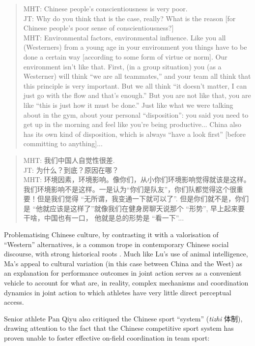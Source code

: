 \begin{CJK}{UTF8}{gbsn}
\begin{quote}
  MHT: Chinese people's conscientiousness is very poor.\\
  JT: Why do you think that is the case, really? What is the reason [for Chinese people's poor sense of conscientiousness?] \\ MHT: Environmental factors, environmental influence.  Like you all (Westerners) from a young age in your environment you things have to be done a certain way [according to some form of virtue or norm].  Our environment isn’t like that.  First, (in a group situation) you (as a Westerner) will think ``we are all teammates,'' and your team all think that this principle is very important.  But we all think ``it doesn’t matter, I can just go with the flow and that’s enough.''  But you are not like that, you are like ``this is just how it must be done.'' Just like what we were talking about in the gym, about your personal ``disposition'': you said you need to get up in the morning and feel like you're being productive... China also has its own kind of disposition, which is always ``have a look first'' [before committing to anything]...
\end{quote}

\begin{quote}
  MHT: 我们中国人自觉性很差. \\
  JT: 为什么？到底？原因在哪？\\
  MHT: 环境因素，环境影响。像你们，从小你们环境影响觉得就该是这样。我们环境影响不是这样。一是认为``你们是队友''，你们队都觉得这个很重要！但是我们觉得 ``无所谓，我变通一下就可以了''. 但是你们就不是，你们是 ``他就应该是这样了''就像我们在健身房聊天说那个 ``形势'', 早上起来要干啥，中国也有一口， 他就是总的形势是  ``看一下''...
\end{quote}

Problematising Chinese culture, by contrasting it with a valorisation of ``Western'' alternatives, is a common trope in contemporary Chinese social discourse, with strong historical roots \citep{Liu1995a}.  Much like Lu's use of animal intelligence, Ma's appeal to cultural variation (in this case between China and the West) as an explanation for performance outcomes in joint action serves as a convenient vehicle to account for what are, in reality, complex mechanisms and coordination dynamics in joint action to which athletes have very little direct perceptual access.

Senior athlete Pan Qiyu also critiqued the Chinese sport ``system'' (\textit{tizhi} 体制), drawing attention to the fact that the Chinese competitive sport system has proven unable to foster effective on-field coordination in team sport:


\end{CJK}
